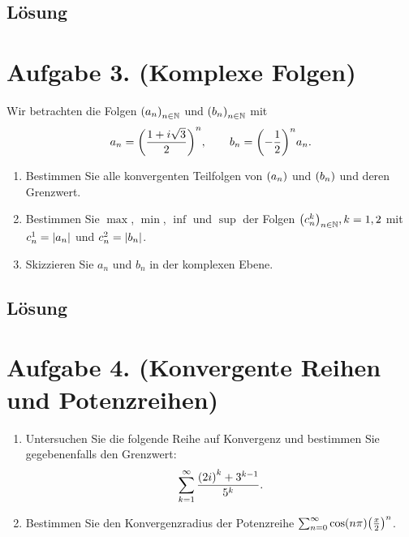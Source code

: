 \documentclass[german,12pt]{homework}
\newcommand{\NN}{\mathbb{N}}
\DeclarePairedDelimiter{\absolute}{\lvert}{\rvert}
\DeclarePairedDelimiter{\enbrace}{(}{)}
\begin{document}
    \subsection*{Lösung} \clearpage

    \section*{Aufgabe 3. (Komplexe Folgen)}

    \begin{problem}
        Wir betrachten die Folgen \(\enbrace*{a_n}_{n \in \NN}\) und \(\enbrace*{b_n}_{n \in \NN}\) mit
        \[a_n = \enbrace*{\frac{1 + i\sqrt{3}}{2}}^n, \qquad
        b_n = \enbrace*{-\frac{1}{2}}^na_n.\]
        \begin{enumerate}
            \item Bestimmen Sie alle konvergenten Teilfolgen von \(\enbrace*{a_n}\) und \(\enbrace*{b_n}\) und deren Grenzwert.
            \item Bestimmen Sie \(\max\), \(\min\), \(\inf\) und \(\sup\) der
            Folgen \(\enbrace*{c_n^k}_{n \in \NN}, k = 1, 2\) mit \(c_n^1 = \absolute*{a_n}\) und \(c_n^2 = \absolute*{b_n}\).
            \item Skizzieren Sie \(a_n\) und \(b_n\) in der komplexen Ebene.
        \end{enumerate}
    \end{problem}

    \subsection*{Lösung} \clearpage

    \section*{Aufgabe 4. (Konvergente Reihen und Potenzreihen)}

    \begin{problem}
        \begin{enumerate}
            \item Untersuchen Sie die folgende Reihe auf Konvergenz und bestimmen Sie gegebenenfalls den Grenzwert:
            \[\sum_{k = 1}^\infty\frac{\enbrace*{2i}^k + 3^{k - 1}}{5^k}.\]
            \item Bestimmen Sie den Konvergenzradius der Potenzreihe \(\sum_{n = 0}^\infty\cos\enbrace*{n\pi}\enbrace*{\frac{x}{2}}^n\).
        \end{enumerate}
    \end{problem}
\end{document}
